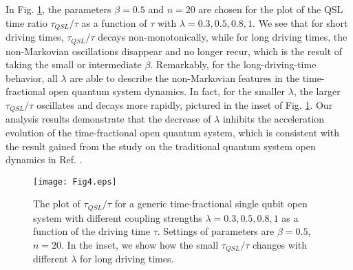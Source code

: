 \documentclass[
showpacs,  %
showkeys,  %
aps,       %
amsthm,    %
amsmath,   %
amsfonts,  %
amssymb    %
]{revtex4-1}          %
\begin{document}
In Fig. \ref{Fig4}, the parameters $\beta=0.5$ and $n=20$ are chosen for the plot of the QSL time ratio ${\tau _{QSL}}/{\tau}$ as a function of $\tau$ with $\lambda=0.3, 0.5, 0.8, 1$. We see that for short driving times, ${\tau _{QSL}}/{\tau}$ decays non-monotonically, while for long driving times, the non-Markovian oscillations disappear and no longer recur, which is the result of taking the small or intermediate $\beta$. Remarkably, for the long-driving-time behavior, all $\lambda$ are able to describe the non-Markovian features in the time-fractional open quantum system dynamics. In fact, for the smaller $\lambda$, the larger ${\tau _{QSL}}/{\tau}$ oscillates and decays more rapidly, pictured in the inset of Fig. \ref{Fig4}. Our analysis results demonstrate that the decrease of $\lambda$ inhibits the acceleration evolution of the time-fractional open quantum system, which is consistent with the result gained from the study on the traditional quantum system open dynamics in Ref. \cite{Teittinen2019}.
\begin{figure}
\texttt{[image: Fig4.eps]}
\caption{The plot of ${\tau _{QSL}}/{\tau}$ for a generic time-fractional single qubit open system with different coupling strengths $\lambda=0.3, 0.5, 0.8, 1$ as a function of the driving time $\tau$. Settings of parameters are $\beta=0.5$, $n=20$. In the inset, we show how the small ${\tau _{QSL}}/{\tau}$ changes with different $\lambda$ for long driving times.}
\label{Fig4}
\end{figure}
\end{document}
